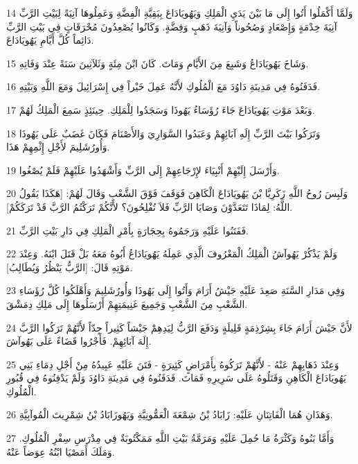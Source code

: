 \par 14 وَلَمَّا أَكْمَلُوا أَتُوا إِلَى مَا بَيْنَ يَدَيِ الْمَلِكِ وَيَهُويَادَاعَ بِبَقِيَّةِ الْفِضَّةِ وَعَمِلُوهَا آنِيَةً لِبَيْتِ الرَّبِّ آنِيَةَ خِدْمَةٍ وَإِصْعَادٍ وَصُحُوناً وَآنِيَةَ ذَهَبٍ وَفِضَّةٍ. وَكَانُوا يُصْعِدُونَ مُحْرَقَاتٍ فِي بَيْتِ الرَّبِّ دَائِماً كُلَّ أَيَّامِ يَهُويَادَاعَ.
\par 15 وَشَاخَ يَهُويَادَاعُ وَشَبِعَ مِنَ الأَيَّامِ وَمَاتَ. كَانَ ابْنَ مِئَةٍ وَثَلاَثِينَ سَنَةً عِنْدَ وَفَاتِهِ.
\par 16 فَدَفَنُوهُ فِي مَدِينَةِ دَاوُدَ مَعَ الْمُلُوكِ لأَنَّهُ عَمِلَ خَيْراً فِي إِسْرَائِيلَ وَمَعَ اللَّهِ وَبَيْتِهِ.
\par 17 وَبَعْدَ مَوْتِ يَهُويَادَاعَ جَاءَ رُؤَسَاءُ يَهُوذَا وَسَجَدُوا لِلْمَلِكِ. حِينَئِذٍ سَمِعَ الْمَلِكُ لَهُمْ.
\par 18 وَتَرَكُوا بَيْتَ الرَّبِّ إِلَهِ آبَائِهِمْ وَعَبَدُوا السَّوَارِيَ وَالأَصْنَامَ فَكَانَ غَضَبٌ عَلَى يَهُوذَا وَأُورُشَلِيمَ لأَجْلِ إِثْمِهِمْ هَذَا.
\par 19 وَأَرْسَلَ إِلَيْهِمْ أَنْبِيَاءَ لإِرْجَاعِهِمْ إِلَى الرَّبِّ وَأَشْهَدُوا عَلَيْهِمْ فَلَمْ يُصْغُوا.
\par 20 وَلَبِسَ رُوحُ اللَّهِ زَكَرِيَّا بْنَ يَهُويَادَاعَ الْكَاهِنَ فَوَقَفَ فَوْقَ الشَّعْبِ وَقَالَ لَهُمْ: [هَكَذَا يَقُولُ اللَّهُ: لِمَاذَا تَتَعَدَّوْنَ وَصَايَا الرَّبِّ فَلاَ تُفْلِحُونَ؟ لأَنَّكُمْ تَرَكْتُمُ الرَّبَّ قَدْ تَرَكَكُمْ].
\par 21 فَفَتَنُوا عَلَيْهِ وَرَجَمُوهُ بِحِجَارَةٍ بِأَمْرِ الْمَلِكِ فِي دَارِ بَيْتِ الرَّبِّ.
\par 22 وَلَمْ يَذْكُرْ يَهُوآشُ الْمَلِكُ الْمَعْرُوفَ الَّذِي عَمِلَهُ يَهُويَادَاعُ أَبُوهُ مَعَهُ بَلْ قَتَلَ ابْنَهُ. وَعِنْدَ مَوْتِهِ قَالَ: [الرَّبُّ يَنْظُرُ وَيُطَالِبُ].
\par 23 وَفِي مَدَارِ السَّنَةِ صَعِدَ عَلَيْهِ جَيْشُ أَرَامَ وَأَتُوا إِلَى يَهُوذَا وَأُورُشَلِيمَ وَأَهْلَكُوا كُلَّ رُؤَسَاءِ الشَّعْبِ مِنَ الشَّعْبِ وَجَمِيعَ غَنِيمَتِهِمْ أَرْسَلُوهَا إِلَى مَلِكِ دِمَشْقَ.
\par 24 لأَنَّ جَيْشَ أَرَامَ جَاءَ بِشِرْذِمَةٍ قَلِيلَةٍ وَدَفَعَ الرَّبُّ لِيَدِهِمْ جَيْشاً كَثِيراً جِدّاً لأَنَّهُمْ تَرَكُوا الرَّبَّ إِلَهَ آبَائِهِمْ. فَأَجْرُوا قَضَاءً عَلَى يَهُوآشَ.
\par 25 وَعِنْدَ ذَهَابِهِمْ عَنْهُ - لأَنَّهُمْ تَرَكُوهُ بِأَمْرَاضٍ كَثِيرَةٍ - فَتَنَ عَلَيْهِ عَبِيدُهُ مِنْ أَجْلِ دِمَاءِ بَنِي يَهُويَادَاعَ الْكَاهِنِ وَقَتَلُوهُ عَلَى سَرِيرِهِ فَمَاتَ. فَدَفَنُوهُ فِي مَدِينَةِ دَاوُدَ وَلَمْ يَدْفِنُوهُ فِي قُبُورِ الْمُلُوكِ.
\par 26 وَهَذَانِ هُمَا الْفَاتِنَانِ عَلَيْهِ: زَابَادُ بْنُ شِمْعَةَ الْعَمُّونِيَّةِ وَيَهُوزَابَادُ بْنُ شِمْرِيتَ الْمُوآبِيَّةِ.
\par 27 وَأَمَّا بَنُوهُ وَكَثْرَةُ مَا حُمِلَ عَلَيْهِ وَمَرَمَّةُ بَيْتِ اللَّهِ مَمَكْتُوبَةٌ فِي مِدْرَسِ سِفْرِ الْمُلُوكِ. وَمَلَكَ أَمَصْيَا ابْنُهُ عِوَضاً عَنْهُ.

